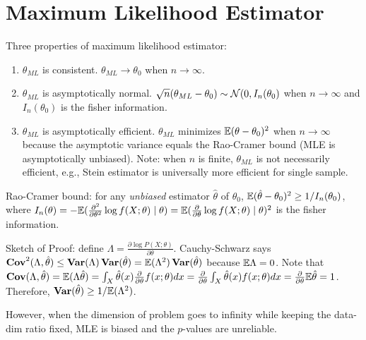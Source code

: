 \section{Maximum Likelihood Estimator}

Three properties of maximum likelihood estimator:
\begin{enumerate}
    \item $\theta_{ML}$ is consistent. $\theta_{ML}\rightarrow \theta_0$ when $n\rightarrow \infty$.
    \item $\theta_{ML}$ is asymptotically normal. $\sqrt{n}(\theta_{ML}-\theta_0) \sim \mathcal{N}(0, I_n(\theta_0)$ when $n\rightarrow \infty$ and $I_n(\theta_0)$ is the fisher information.
    \item $\theta_{ML}$ is asymptotically efficient. $\theta_{ML}$ minimizes $\mathbb{E}(\theta-\theta_0)^2$ when $n\rightarrow \infty$ because the asymptotic variance equals the Rao-Cramer bound (MLE is asymptotically unbiased). Note: when $n$ is finite, $\theta_{ML}$ is not necessarily efficient, e.g., Stein estimator is universally more efficient for single sample.
\end{enumerate}

Rao-Cramer bound: for any \emph{unbiased} estimator $\hat{\theta}$ of $\theta_0$, $\mathbb{E} (\hat{\theta}-\theta_0)^2 \ge 1/I_n(\theta_0)$, where $I_n(\theta) = -\mathbb{E} (\frac{\partial^2}{\partial \theta^2} \log f(X;\theta)\mid \theta) = \mathbb{E} (\frac{\partial}{\partial \theta} \log f(X; \theta) \mid \theta)^2$ is the fisher information.

Sketch of Proof: define $\Lambda = \frac{\partial \log P(X;\theta)}{\partial \theta}$. Cauchy-Schwarz says $\operatorname{\textbf{Cov}}^2(\Lambda, \hat{\theta})\le \operatorname{\textbf{Var}}(\Lambda)\operatorname{\textbf{Var}}(\hat{\theta}) = \mathbb{E}(\Lambda^2) \operatorname{\textbf{Var}}(\hat{\theta})$ because $\mathbb{E} \Lambda=0$. Note that $\operatorname{\textbf{Cov}}(\Lambda, \hat{\theta}) = \mathbb{E}(\Lambda\hat{\theta}) = \int_X \hat{\theta}(x) \frac{\partial}{\partial \theta}f(x;\theta) dx = \frac{\partial}{\partial \theta} \int_X \hat{\theta}(x) f(x;\theta) dx = \frac{\partial}{\partial \theta} \mathbb{E} \hat{\theta} = 1$. Therefore, $\operatorname{\textbf{Var}}(\hat{\theta}) \ge 1/\mathbb{E}(\Lambda^2)$.

However, when the dimension of problem goes to infinity while keeping the data-dim ratio fixed, MLE is biased and the $p$-values are unreliable. 